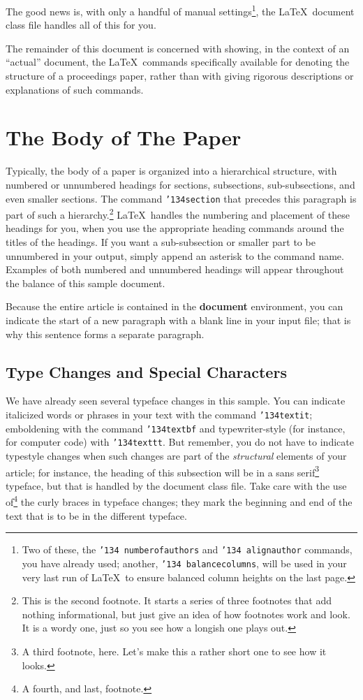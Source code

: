 \documentclass{sig-alternate2-pods09}
\begin{document}
The good news is, with only a handful of manual
settings\footnote{Two of these, the {\texttt{\char'134 numberofauthors}}
and {\texttt{\char'134 alignauthor}} commands, you have
already used; another, {\texttt{\char'134 balancecolumns}}, will
be used in your very last run of \LaTeX\ to ensure
balanced column heights on the last page.}, the \LaTeX\ document
class file handles all of this for you.

The remainder of this document is concerned with showing, in
the context of an ``actual'' document, the \LaTeX\ commands
specifically available for denoting the structure of a
proceedings paper, rather than with giving rigorous descriptions
or explanations of such commands.

\section{The {\secit Body} of The Paper}
Typically, the body of a paper is organized
into a hierarchical structure, with numbered or unnumbered
headings for sections, subsections, sub-subsections, and even
smaller sections.  The command \texttt{{\char'134}section} that
precedes this paragraph is part of such a
hierarchy.\footnote{This is the second footnote.  It
starts a series of three footnotes that add nothing
informational, but just give an idea of how footnotes work
and look. It is a wordy one, just so you see
how a longish one plays out.} \LaTeX\ handles the numbering
and placement of these headings for you, when you use
the appropriate heading commands around the titles
of the headings.  If you want a sub-subsection or
smaller part to be unnumbered in your output, simply append an
asterisk to the command name.  Examples of both
numbered and unnumbered headings will appear throughout the
balance of this sample document.

Because the entire article is contained in
the \textbf{document} environment, you can indicate the
start of a new paragraph with a blank line in your
input file; that is why this sentence forms a separate paragraph.

\subsection{Type Changes and {\subsecit Special} Characters}
We have already seen several typeface changes in this sample.  You
can indicate italicized words or phrases in your text with
the command \texttt{{\char'134}textit}; emboldening with the
command \texttt{{\char'134}textbf}
and typewriter-style (for instance, for computer code) with
\texttt{{\char'134}texttt}.  But remember, you do not
have to indicate typestyle changes when such changes are
part of the \textit{structural} elements of your
article; for instance, the heading of this subsection will
be in a sans serif\footnote{A third footnote, here.
Let's make this a rather short one to
see how it looks.} typeface, but that is handled by the
document class file. Take care with the use
of\footnote{A fourth, and last, footnote.}
the curly braces in typeface changes; they mark
the beginning and end of
the text that is to be in the different typeface.
\end{document}
